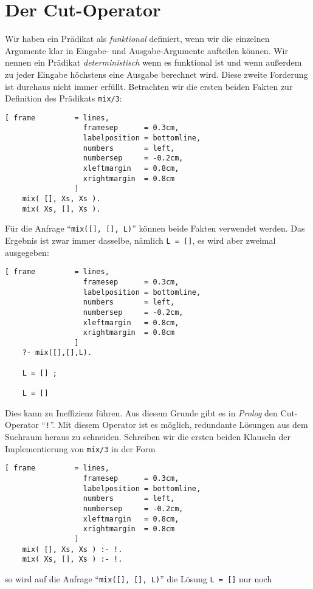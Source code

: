 \section{Der Cut-Operator}
Wir haben ein Prädikat als \emph{funktional} definiert,
wenn wir die einzelnen Argumente klar in Eingabe- und Ausgabe-Argumente
aufteilen können.  Wir nennen ein Prädikat \emph{deterministisch} wenn es funktional ist
und wenn außerdem zu jeder Eingabe höchstens eine Ausgabe berechnet
wird.  Diese zweite Forderung ist durchaus nicht immer erfüllt.  Betrachten wir die ersten
beiden Fakten zur Definition des Prädikats \texttt{mix/3}:
\begin{Verbatim}[ frame         = lines, 
                  framesep      = 0.3cm, 
                  labelposition = bottomline,
                  numbers       = left,
                  numbersep     = -0.2cm,
                  xleftmargin   = 0.8cm,
                  xrightmargin  = 0.8cm
                ]
    mix( [], Xs, Xs ).    
    mix( Xs, [], Xs ).
\end{Verbatim}
Für die Anfrage ``\texttt{mix([], [], L)}'' können beide Fakten verwendet werden.
Das Ergebnis ist zwar immer dasselbe, nämlich \texttt{L = []}, es wird aber zweimal ausgegeben:
\begin{Verbatim}[ frame         = lines, 
                  framesep      = 0.3cm, 
                  labelposition = bottomline,
                  numbers       = left,
                  numbersep     = -0.2cm,
                  xleftmargin   = 0.8cm,
                  xrightmargin  = 0.8cm
                ]
    ?- mix([],[],L).
    
    L = [] ;
    
    L = [] 
\end{Verbatim}
Dies kann zu Ineffizienz führen.  Aus diesem Grunde gibt es in \textsl{Prolog} den
Cut-Operator ``\texttt{!}''.  Mit diesem Operator ist es möglich, redundante Lösungen aus
dem Suchraum heraus zu schneiden.  Schreiben wir die ersten beiden Klauseln der
Implementierung von \texttt{mix/3} in der Form 
\begin{Verbatim}[ frame         = lines, 
                  framesep      = 0.3cm, 
                  labelposition = bottomline,
                  numbers       = left,
                  numbersep     = -0.2cm,
                  xleftmargin   = 0.8cm,
                  xrightmargin  = 0.8cm
                ]
    mix( [], Xs, Xs ) :- !.
    mix( Xs, [], Xs ) :- !.
\end{Verbatim}
so wird auf die Anfrage  ``\texttt{mix([], [], L)}'' die Lösung \texttt{L = []} nur noch
